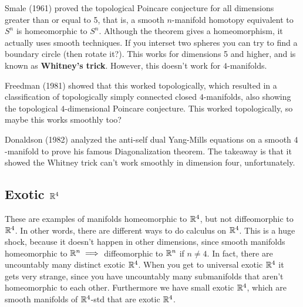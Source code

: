 Smale (1961) proved the topological Poincare conjecture for all dimensions greater than or equal to 5, that is, a smooth $n$-manifold homotopy equivalent to $S^n $ is homeomorphic to $S^n $. Although the theorem gives a homeomorphism, it actually uses smooth techniques. If you interset two spheres you can try to find a boundary circle (then rotate it?). This works for dimensions 5 and higher, and is known as \textbf{Whitney's trick}. However, this doesn't work for $4$-manifolds.

Freedman (1981) showed that this worked topologically, which resulted in a classification of topologically simply connected closed $4$-manifolds, also showing the topological $4$-dimensional Poincare conjecture. This worked topologically, so maybe this works smoothly too?

Donaldson (1982) analyzed the anti-self dual Yang-Mills equations on a smooth $4$-manifold to prove his famous Diagonalization theorem. The takeaway is that it showed the Whitney trick can't work smoothly in dimension four, unfortunately.
\subsection{Exotic $\mathbb{R}^4$}
   These are examples of manifolds homeomorphic to $\mathbb{R}^4$, but not diffeomorphic to $\mathbb{R}^4$. In other words, there are different ways to do calculus on $\mathbb{R}^4$. This is a huge shock, because it doesn't happen in other dimensions, since smooth manifolds homeomorphic to $\mathbb{R}^n \implies $ diffeomorphic to $\mathbb{R}^n $ if $n\neq 4$. In fact, there are uncountably many distinct exotic $\mathbb{R}^4$. When you get to universal exotic $\mathbb{R}^4$ it gets very strange, since you have uncountably many submanifolds that aren't homeomorphic to each other. Furthermore we have small exotic $\mathbb{R}^4$, which are smooth manifolds of $\mathbb{R}^4$-std that are exotic $\mathbb{R}^4$.

